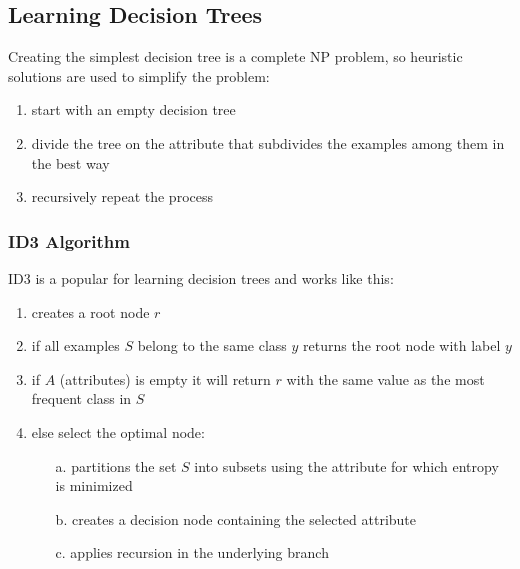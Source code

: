 \subsection{Learning Decision Trees}
Creating the simplest decision tree is a complete NP problem, so heuristic solutions are used to simplify the problem:
\begin{enumerate}
    \item start with an empty decision tree
    \item divide the tree on the attribute that subdivides the examples among them in the best way
    \item recursively repeat the process
\end{enumerate}

\subsubsection{ID3 Algorithm}
ID3 is a popular for learning decision trees and works like this:
\begin{enumerate}
    \item creates a root node $r$
    \item if all examples $S$ belong to the same class $y$ returns the root node with label $y$
    \item if $A$ (attributes) is empty it will return $r$ with the same value as the most frequent class in $S$
    \item else select the optimal node:
    \begin{enumerate}
        \item[a.] partitions the set $S$ into subsets using the attribute for which entropy is minimized
        \item[b.] creates a decision node containing the selected attribute
        \item[c.] applies recursion in the underlying branch
    \end{enumerate}
\end{enumerate}

